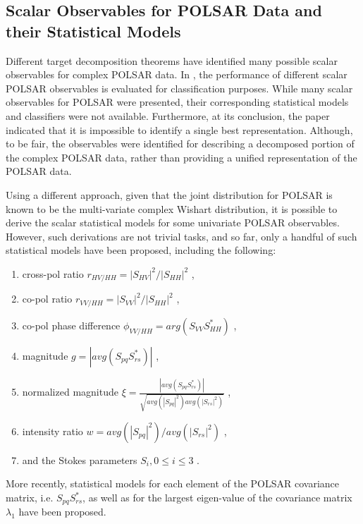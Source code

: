 \documentclass[journal]{IEEEtran}
\begin{document}
\subsection{Scalar Observables for POLSAR Data and their Statistical Models}
\label{sec:lit_models}

Different target decomposition theorems have identified many possible scalar observables for complex POLSAR data.
In \cite{Alberga_2008_IJRS_4129}, the performance of different scalar POLSAR observables is evaluated for classification purposes.
While many scalar observables for POLSAR were presented, their corresponding statistical models and classifiers were not available.
Furthermore, at its conclusion, the paper indicated that it is impossible to identify a single best representation.
Although, to be fair, the observables were identified for describing a decomposed portion of the complex POLSAR data,
  rather than providing a unified representation of the POLSAR data.

Using a different approach, given that the joint distribution for POLSAR is known to be the multi-variate complex Wishart distribution,
  it is possible to derive the scalar statistical models for some univariate POLSAR observables.
However, such derivations are not trivial tasks, and so far, only a handful of such statistical models have been proposed, including the following:
  \begin{enumerate}
  \item cross-pol ratio $r_{HV/HH} = |S_{HV}|^2/|S_{HH}|^2$ \cite{Joughin_1994_TGRS_562},
  \item co-pol ratio $r_{VV/HH} = |S_{VV}|^2/|S_{HH}|^2$ \cite{Joughin_1994_TGRS_562},
  \item co-pol phase difference $\phi_{VV/HH} = arg(S_{VV}S_{HH}^*) $ \cite{Joughin_1994_TGRS_562} \cite{Lee_1994_TGRS_1017},
  \item magnitude $g=|avg(S_{pq}S_{rs}^*)|$ \cite{Lee_1994_TGRS_1017},
  \item normalized magnitude $\xi = \frac{|avg(S_{pq}S_{rs}^*)|}{\sqrt{avg(|S_{pq}|^2) avg(|S_{rs}|^2)}}$ \cite{Lee_1994_TGRS_1017},
  \item intensity ratio $w = avg(|S_{pq}|^2)/avg(|S_{rs}|^2)$ \cite{Lee_1994_TGRS_1017},
  \item and the Stokes parameters $S_i,0 \leq i \leq 3$ \cite{Touzi_1996_TGRS_519}. 
  \end{enumerate}
More recently, statistical models for
  each element of the POLSAR covariance matrix, i.e. $S_{pq}S_{rs}^*$, \cite{Lopez-Martinez_2003_TGRS_2232}
  as well as for the largest eigen-value of the covariance matrix $\lambda_1$ \cite{Erten_2012_Sensors_2766} have been proposed.
\end{document}

